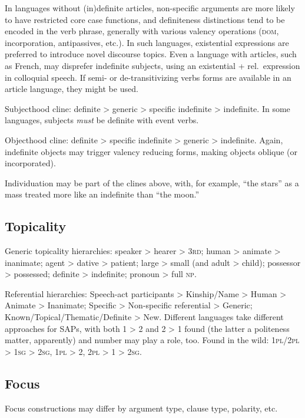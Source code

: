 \documentclass[11pt]{article}
\newcommand{\I}[1]{\textsc{#1}}   %
\begin{document}
In languages without (in)definite articles, non-specific arguments are
more likely to have restricted core case functions, and definiteness
distinctions tend to be encoded in the verb phrase, generally with
various valency operations (\I{dom}, incorporation, antipassives,
etc.).  In such languages, existential expressions are preferred to
introduce novel discourse topics.  Even a language with articles, such
as French, may disprefer indefinite subjects, using an existential +
rel.\ expression in colloquial speech.  If semi- or de-transitivizing
verbs forms are available in an article language, they might be used.

Subjecthood cline: definite > generic > specific indefinite >
indefinite.  In some languages, subjects \textit{must} be definite
with event verbs.

Objecthood cline: definite > specific indefinite > generic >
indefinite.  Again, indefinite objects may trigger valency reducing
forms, making objects oblique (or incorporated).

Individuation may be part of the clines above, with, for example,
``the stars'' as a mass treated more like an indefinite than ``the
moon.'' 


\subsection{Topicality}
Generic topicality hierarchies: speaker > hearer > \I{3rd}; human >
animate > inanimate; agent > dative > patient; large > small (and
adult > child); possessor > possessed; definite > indefinite; pronoun
> full \I{np}.

Referential hierarchies: Speech-act participants > Kinship/Name >
Human > Animate > Inanimate; Specific > Non-specific referential >
Generic; Known/Topical/Thematic/Definite > New.  Different languages
take different approaches for SAPs, with both 1 > 2 and 2 > 1 found
(the latter a politeness matter, apparently) and number may play a
role, too. Found in the wild: \I{1pl/2pl > 1sg > 2sg}, \I{1pl > 2},
\I{2pl > 1 > 2sg}.

\subsection{Focus}
Focus constructions may differ by argument type, clause type,
polarity, etc.
\end{document}
